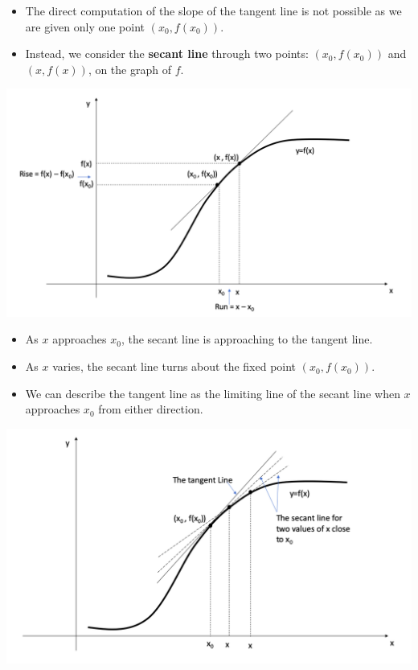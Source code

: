 \documentclass[]{book}
\providecommand{\tightlist}{%
  \setlength{\itemsep}{0pt}\setlength{\parskip}{0pt}}
\begin{document}
\begin{itemize}
\tightlist
\item
  The direct computation of the slope of the tangent line is not possible as we are given only one point \((x_0, f{(x_0)})\).
\item
  Instead, we consider the \textbf{secant line} through two points: \((x_0, f{(x_0)})\) and \((x, f{(x)})\), on the graph of \(f\).
\end{itemize}

\begin{center}\includegraphics[width=0.7\linewidth]{figure/5Derivatives-2} \end{center}

\begin{itemize}
\tightlist
\item
  As \(x\) approaches \(x_0\), the secant line is approaching to the tangent line.
\item
  As \(x\) varies, the secant line turns about the fixed point \((x_0, f{(x_0)})\).
\item
  We can describe the tangent line as the limiting line of the secant line when \(x\) approaches \(x_0\) from either direction.
\end{itemize}

\begin{center}\includegraphics[width=0.7\linewidth]{figure/5Derivatives-3} \end{center}
\end{document}
